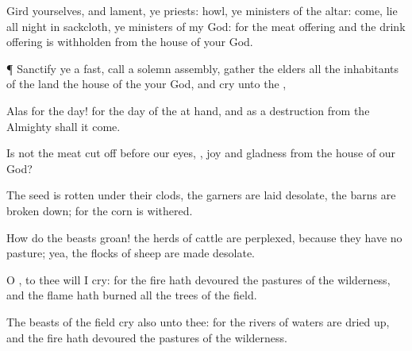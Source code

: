 {Gird yourselves, and
lament, ye
priests:
howl, ye
ministers of the
altar:
come, lie all
night in
sackcloth, ye
ministers of my
God: for the meat
offering and the drink
offering is
withholden from the
house of your
God.


\par }{\PP {}¶
Sanctify ye a
fast,
call a solemn
assembly,
gather the
elders
{} all the
inhabitants of the
land
{} the
house of the
{} your
God, and
cry unto the
{},

Alas for the
day! for the
day of the
{}
{} at
hand, and as a
destruction from the
Almighty shall it
come.

Is not the
meat cut
off before our
eyes,
{},
joy and
gladness from the
house of our
God?

The
seed is
rotten under their
clods, the
garners are laid
desolate, the
barns are broken
down; for the
corn is
withered.

How do the
beasts
groan! the
herds of
cattle are
perplexed, because they have no
pasture; yea, the
flocks of
sheep are made
desolate.

O
{}, to thee will I
cry: for the
fire hath
devoured the
pastures of the
wilderness, and the
flame hath
burned all the
trees of the
field.

The
beasts of the
field
cry also unto thee: for the
rivers of
waters are dried
up, and the
fire hath
devoured the
pastures of the
wilderness.




\par }
